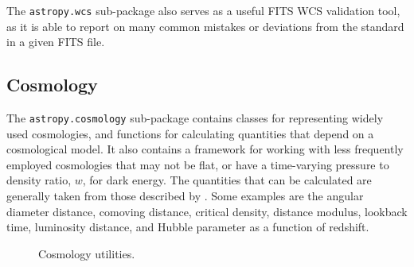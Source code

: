 \documentclass[traditabstract]{aa}
\begin{document}
The \texttt{astropy.wcs} sub-package also serves as a useful FITS WCS validation
tool, as it is able to report on many common mistakes or deviations from the
standard in a given FITS file.

\subsection{Cosmology}

\label{sec:cosmology}


The \texttt{astropy.cosmology} sub-package contains classes for representing
widely used cosmologies, and functions for calculating quantities that depend
on a cosmological model. It also contains a framework for working with less
frequently employed cosmologies that may not be flat, or have a time-varying
pressure to density ratio, $w$, for dark energy. The quantities that can be
calculated are generally taken from those described by \citet{Hogg99}. Some
examples are the angular diameter distance, comoving distance, critical
density, distance modulus, lookback time, luminosity distance, and Hubble
parameter as a function of redshift.

\begin{figure}
\center
\caption{Cosmology utilities.\label{code:cosmology}}
\vspace{0.1in}
\end{figure}
\end{document}

